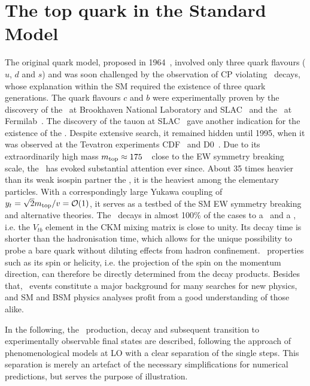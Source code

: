\section{The top quark in the Standard Model}
\label{sect:TopQuarkPhysics}
%
The original quark model, proposed in 1964~\cite{GellMann:1964nj,Zweig:1981pd}, involved only three quark flavours ($u$, $d$ and $s$) and was soon challenged by the observation of \gls{CP} violating \Kmeson\ decays, whose explanation within the \gls{SM} required the existence of three quark generations. 
%
The quark flavours $c$ and $b$ were experimentally proven by the discovery of the \Jpsimeson\ at Brookhaven National Laboratory and \gls{SLAC}~\cite{Aubert:1974js,Augustin:1974xw} and the \Upsilonmeson\ at Fermilab~\cite{Herb:1977ek}.
%
The discovery of the tauon at \gls{SLAC}~\cite{Perl:1975bf} gave another indication for the existence of the \tquark. Despite extensive search, it remained hidden until 1995, when it was observed at the Tevatron experiments \gls{CDF}~\cite{PhysRevLett.74.2626} and \gls{D0}~\cite{Abachi:1995iq}.
%
%
Due to its extraordinarily high mass $m_{\mathrm{top}}\approx 175$~\GeV\ close to the \gls{EW} symmetry breaking scale, the \tquark\ has evoked substantial attention ever since.
%
About 35 times heavier than its weak isospin partner the \bquark, it is the heaviest among the elementary particles. With a correspondingly large Yukawa coupling of $y_{t}=\sqrt{2}m_{\mathrm{top}}/v=\mathcal O(1)$, it serves as a testbed of the \gls{SM} \gls{EW} symmetry breaking and alternative theories. 
%
The \tquark\ decays in almost 100\% of the cases to a \bquark\ and a \Wplusboson, i.e. the $V_{tb}$ element in the \gls{CKM} mixing matrix is close to unity. 
%
Its decay time is shorter than the hadronisation time, which allows for the unique possibility to probe a bare quark without diluting effects from hadron confinement. \Tquark\ properties such as its spin or helicity, i.e. the projection of the spin on the momentum direction, can therefore be directly determined from the decay products. 
%
Besides that, \tquark\ events constitute a major background for many searches for new physics, and \gls{SM} and \gls{BSM} physics analyses profit from a good understanding of those alike. 


In the following, the \tquark\ production, decay and subsequent transition to experimentally observable final states are described, following the approach of phenomenological models at \gls{LO} with a clear separation of the single steps. This separation is merely an artefact of the necessary simplifications for numerical predictions, but serves the purpose of illustration. 









